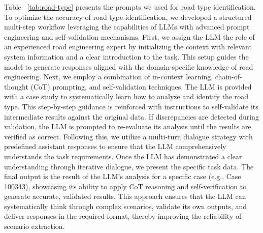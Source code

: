 Table ~\ref{tab:road-type} presents the prompts we used for road type identification. To optimize the accuracy of road type identification, we developed a structured multi-step workflow leveraging the capabilities of LLMs with advanced prompt engineering and self-validation mechanisms. First, we assign the LLM the role of an experienced road engineering expert by initializing the context with relevant system information and a clear introduction to the task. This setup guides the model to generate responses aligned with the domain-specific knowledge of road engineering. Next, we employ a combination of in-context learning, chain-of-thought (CoT) prompting, and self-validation techniques. The LLM is provided with a case study to systematically learn how to analyze and identify the road type. This step-by-step guidance is reinforced with instructions to self-validate its intermediate results against the original data. If discrepancies are detected during validation, the LLM is prompted to re-evaluate its analysis until the results are verified as correct. Following this, we utilize a multi-turn dialogue strategy with predefined assistant responses to ensure that the LLM comprehensively understands the task requirements. Once the LLM has demonstrated a clear understanding through iterative dialogue, we present the specific task data. The final output is the result of the LLM's analysis for a specific case (e.g., Case 100343), showcasing its ability to apply CoT reasoning and self-verification to generate accurate, validated results. This approach ensures that the LLM can systematically think through complex scenarios, validate its own outputs, and deliver responses in the required format, thereby improving the reliability of scenario extraction.


